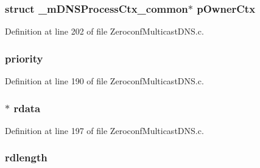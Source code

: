 \subsubsection[{p\+Owner\+Ctx}]{\setlength{\rightskip}{0pt plus 5cm}struct {\bf \+\_\+m\+D\+N\+S\+Process\+Ctx\+\_\+common}$\ast$ p\+Owner\+Ctx}\label{struct__m_d_n_s_resource_record_a17a6eba9a7fe3cd1c3312e0d3bacc735}


Definition at line 202 of file Zeroconf\+Multicast\+D\+N\+S.\+c.

\hypertarget{struct__m_d_n_s_resource_record_ae7ba91b5092176acf23540d2526a36c5}{}
\subsubsection[{priority}]{ priority}\label{struct__m_d_n_s_resource_record_ae7ba91b5092176acf23540d2526a36c5}


Definition at line 190 of file Zeroconf\+Multicast\+D\+N\+S.\+c.

\hypertarget{struct__m_d_n_s_resource_record_aac1fbe6e2e3029adacb4d570c7f6900c}{}
\subsubsection[{rdata}]{$\ast$ rdata}\label{struct__m_d_n_s_resource_record_aac1fbe6e2e3029adacb4d570c7f6900c}


Definition at line 197 of file Zeroconf\+Multicast\+D\+N\+S.\+c.

\hypertarget{struct__m_d_n_s_resource_record_a6a0c8277d98664a2fb6307181c99b51f}{}
\subsubsection[{rdlength}]{ rdlength}\label{struct__m_d_n_s_resource_record_a6a0c8277d98664a2fb6307181c99b51f}


